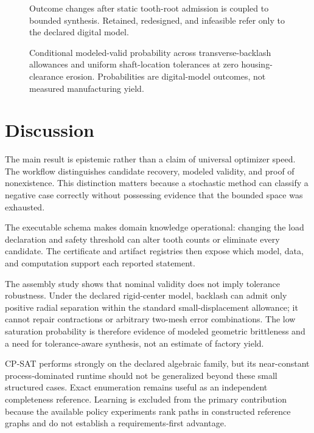\documentclass[preprint,12pt]{elsarticle}
\begin{document}
\begin{figure}[htbp]
\centering

\caption{Outcome changes after static tooth-root admission is coupled to bounded synthesis. Retained, redesigned, and infeasible refer only to the declared digital model.}
\end{figure}
\begin{figure}[htbp]
\centering

\caption{Conditional modeled-valid probability across transverse-backlash allowances and uniform shaft-location tolerances at zero housing-clearance erosion. Probabilities are digital-model outcomes, not measured manufacturing yield.}
\end{figure}
\section{Discussion}
The main result is epistemic rather than a claim of universal optimizer speed. The workflow distinguishes candidate recovery, modeled validity, and proof of nonexistence. This distinction matters because a stochastic method can classify a negative case correctly without possessing evidence that the bounded space was exhausted.

The executable schema makes domain knowledge operational: changing the load declaration and safety threshold can alter tooth counts or eliminate every candidate. The certificate and artifact registries then expose which model, data, and computation support each reported statement.

The assembly study shows that nominal validity does not imply tolerance robustness. Under the declared rigid-center model, backlash can admit only positive radial separation within the standard small-displacement allowance; it cannot repair contractions or arbitrary two-mesh error combinations. The low saturation probability is therefore evidence of modeled geometric brittleness and a need for tolerance-aware synthesis, not an estimate of factory yield.

CP-SAT performs strongly on the declared algebraic family, but its near-constant process-dominated runtime should not be generalized beyond these small structured cases. Exact enumeration remains useful as an independent completeness reference. Learning is excluded from the primary contribution because the available policy experiments rank paths in constructed reference graphs and do not establish a requirements-first advantage.
\end{document}
